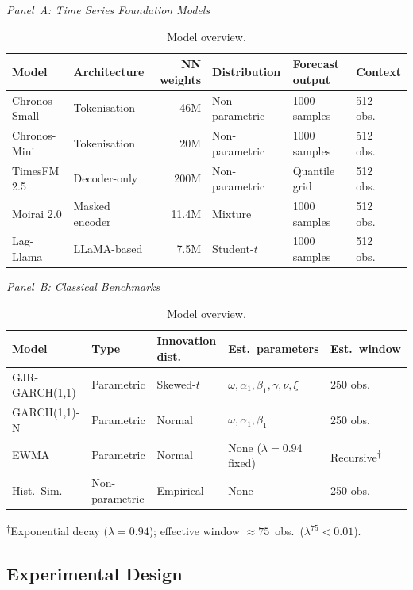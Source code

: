\documentclass[preprint,11pt,authoryear]{elsarticle}
\newcommand{\1}{\boldsymbol{1}}
\begin{document}
	\begin{table}[H]
		\centering
		\scriptsize
		\caption{Model overview.}
		\label{tab:models}
		
		\medskip
		\textit{Panel~A: Time Series Foundation Models}
		\smallskip
		
		\begin{tabular}{@{}llrlll@{}}
			\toprule
			Model & Architecture & NN weights
			& Distribution & Forecast output & Context \\
			\midrule
			Chronos-Small  & Tokenisation   & 46M
			& Non-parametric & 1000 samples  & 512 obs.\ \\
			Chronos-Mini   & Tokenisation   & 20M
			& Non-parametric & 1000 samples  & 512 obs.\ \\
			TimesFM 2.5    & Decoder-only   & 200M
			& Non-parametric & Quantile grid & 512 obs.\ \\
			Moirai 2.0     & Masked encoder & 11.4M
			& Mixture        & 1000 samples  & 512 obs.\ \\
			Lag-Llama      & LLaMA-based    & 7.5M
			& Student-$t$    & 1000 samples  & 512 obs.\ \\
			\bottomrule
		\end{tabular}
		
		\bigskip
		\textit{Panel~B: Classical Benchmarks}
		\smallskip
		
		\begin{tabular}{@{}lllll@{}}
			\toprule
			Model & Type & Innovation dist.\
			& Est.\ parameters & Est.\ window \\
			\midrule
			GJR-GARCH(1,1) & Parametric & Skewed-$t$
			& $\omega,\alpha_1,\beta_1,\gamma,\nu,\xi$
			& 250 obs.\ \\
			GARCH(1,1)-N   & Parametric & Normal
			& $\omega,\alpha_1,\beta_1$
			& 250 obs.\ \\
			EWMA           & Parametric & Normal
			& None ($\lambda = 0.94$ fixed)
			& Recursive\textsuperscript{$\dagger$} \\
			Hist.\ Sim.    & Non-parametric & Empirical
			& None
			& 250 obs.\ \\
			\bottomrule
		\end{tabular}
		
		\smallskip
		{\footnotesize
			\textsuperscript{$\dagger$}Exponential decay
			($\lambda = 0.94$); effective window
			$\approx 75$~obs.\ ($\lambda^{75} < 0.01$).}
	\end{table}
	
	\subsection{Experimental Design}
	
\end{document}
